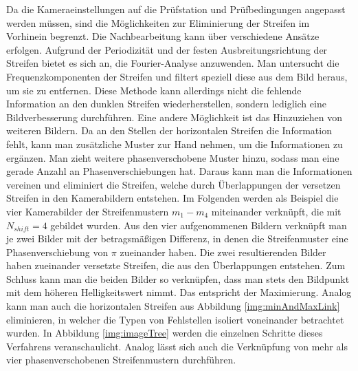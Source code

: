 Da die Kameraeinstellungen auf die Prüfstation und Prüfbedingungen angepasst werden müssen, sind die Möglichkeiten zur Eliminierung der Streifen im Vorhinein begrenzt.
Die Nachbearbeitung kann über verschiedene Ansätze erfolgen.
Aufgrund der Periodizität und der festen Ausbreitungsrichtung der Streifen bietet es sich an, die Fourier-Analyse anzuwenden.
Man untersucht die Frequenzkomponenten der Streifen und filtert speziell diese aus dem Bild heraus, um sie zu entfernen.
Diese Methode kann allerdings nicht die fehlende Information an den dunklen Streifen wiederherstellen, sondern lediglich eine Bildverbesserung durchführen.
Eine andere Möglichkeit ist das Hinzuziehen von weiteren Bildern.
Da an den Stellen der horizontalen Streifen die Information fehlt, kann man zusätzliche Muster zur Hand nehmen, um die Informationen zu ergänzen.
Man zieht weitere phasenverschobene Muster hinzu, sodass man eine gerade Anzahl an Phasenverschiebungen hat.
Daraus kann man die Informationen vereinen und eliminiert die Streifen, welche durch Überlappungen der versetzen Streifen in den Kamerabildern entstehen.
Im Folgenden werden als Beispiel die vier Kamerabilder der Streifenmustern $m_1 - m_4$ miteinander verknüpft, die mit $N_{shift} = 4$ gebildet wurden.
Aus den vier aufgenommenen Bildern verknüpft man je zwei Bilder mit der betragsmäßigen Differenz, in denen die Streifenmuster eine Phasenverschiebung von $\pi$ zueinander haben.
Die zwei resultierenden Bilder haben zueinander versetzte Streifen, die aus den Überlappungen entstehen.
Zum Schluss kann man die beiden Bilder so verknüpfen, dass man stets den Bildpunkt mit dem höheren Helligkeitswert nimmt.
Das entspricht der Maximierung.
Analog kann man auch die horizontalen Streifen aus Abbildung \ref{img:minAndMaxLink} eliminieren, in welcher die Typen von Fehlstellen isoliert voneinander betrachtet wurden.
In Abbildung \ref{img:imageTree} werden die einzelnen Schritte dieses Verfahrens veranschaulicht.
Analog lässt sich auch die Verknüpfung von mehr als vier phasenverschobenen Streifenmustern durchführen.

